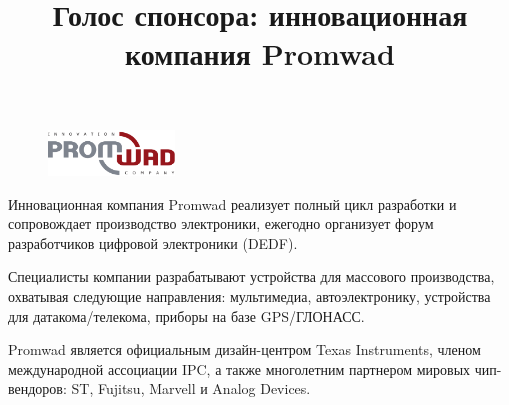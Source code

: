 \documentclass[10pt, a5paper]{article}
\begin{document}
\title{Голос спонсора: инновационная компания Promwad}
\date{}
\maketitle
\begin{figure}
\begin{center}
\includegraphics[width=0.299\textwidth]{53_spons_promwad.pdf}
\end{center}
\end{figure}
Инновационная компания Promwad реализует полный цикл разработки и сопровождает
производство электроники, ежегодно организует форум разработчиков цифровой
электроники (DEDF).

Специалисты компании разрабатывают устройства для массового производства,
охватывая следующие направления: мультимедиа, автоэлектронику, устройства для
датакома/телекома, приборы на базе GPS/ГЛОНАСС.

Promwad является официальным дизайн-центром Texas Instruments, членом
международной ассоциации IPC, а также многолетним партнером мировых
чип-вендоров: ST, Fujitsu, Marvell и Analog Devices.
\end{document}
